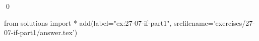 
\begin{ex}
  \label{ex:27-07-if-part1}
  
  \qed
\end{ex}
\begin{python0}
from solutions import *
add(label="ex:27-07-if-part1",
    srcfilename='exercises/27-07-if-part1/answer.tex')
\end{python0}
